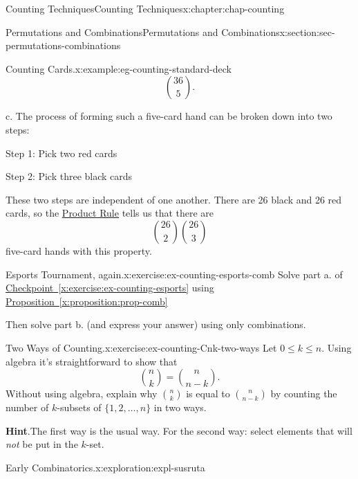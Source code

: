 \documentclass[oneside,10pt,]{book}
\newcommand{\blocktitlefont}{\relax}
\newcommand{\xreffont}{\relax}
\numberwithin{equation}{section}
\begin{document}
\begin{chapterptx}{Counting Techniques}{}{Counting Techniques}{}{}{x:chapter:chap-counting}
\begin{sectionptx}{Permutations and Combinations}{}{Permutations and Combinations}{}{}{x:section:sec-permutations-combinations}
\begin{example}{Counting Cards.}{x:example:eg-counting-standard-deck}
\begin{equation*}
\binom{36}{5}\text{.}
\end{equation*}
%
\par
c. The process of forming such a five-card hand can be broken down into two steps:%
\begin{sidebyside}{2}{0.05}{0.05}{0.1}%
\begin{sbspanel}{0.4}%
Step 1: Pick two red cards%
\end{sbspanel}%
\begin{sbspanel}{0.4}%
\par
Step 2: Pick three black cards%
\end{sbspanel}%
\end{sidebyside}%
\par
These two steps are independent of one another. There are 26 black and 26 red cards, so the \hyperref[x:principle:prin-prod-rule]{Product Rule} tells us that there are%
\begin{equation*}
\binom{26}{2}\binom{26}{3}
\end{equation*}
five-card hands with this property.%
\end{example}
\begin{inlineexercise}{Esports Tournament, again.}{x:exercise:ex-counting-esports-comb}%
Solve part a. of \hyperref[x:exercise:ex-counting-esports]{Checkpoint~{\xreffont\ref{x:exercise:ex-counting-esports}}} using \hyperref[x:proposition:prop-comb]{Proposition~{\xreffont\ref{x:proposition:prop-comb}}}%
\par
Then solve part b. (and express your answer) using only combinations.%
\end{inlineexercise}
\begin{inlineexercise}{Two Ways of Counting.}{x:exercise:ex-counting-Cnk-two-ways}%
Let \(0 \leq k \leq n\). Using algebra it's straightforward to show that%
\begin{equation*}
\binom{n}{k} = \binom{n}{n-k}\text{.}
\end{equation*}
Without using algebra, explain why \(\displaystyle\binom{n}{k}\) is equal to \(\displaystyle\binom{n}{n-k}\) by counting the number of \(k\)-subsets of \(\{1,2,\ldots,n\}\) in two ways.%
\par\smallskip%
\noindent\textbf{\blocktitlefont Hint}.\hypertarget{g:hint:id461276}{}\quad{}The first way is the usual way. For the second way: select elements that will \emph{not} be put in the \(k\)-set.%
\end{inlineexercise}
\begin{exploration}{Early Combinatorics.}{x:exploration:expl-susruta}%

\end{exploration}
\end{sectionptx}
\end{chapterptx}
\end{document}
